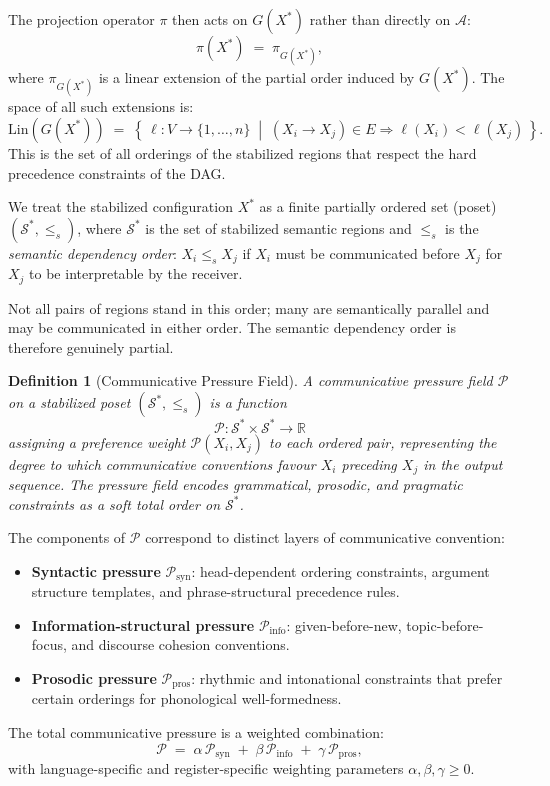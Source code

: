 \documentclass[11pt, a4paper]{article}
\theoremstyle{srn}
\newtheorem{definition}{Definition}[section]
\theoremstyle{srnremark}
\newcommand{\Aspace}{\mathcal{A}}           %
\begin{document}
The projection operator $\pi$ then acts on $G(X^*)$ rather than
directly on $\Aspace$:
\[
  \pi(X^*) \;=\; \pi_{G(X^*)},
\]
where $\pi_{G(X^*)}$ is a linear extension of the partial order
induced by $G(X^*)$.
The space of all such extensions is:
\[
  \mathrm{Lin}(G(X^*))
  \;=\;
  \left\{\,\ell : V \to \{1,\ldots,n\} \;\middle|\;
    (X_i \to X_j) \in E \Rightarrow \ell(X_i) < \ell(X_j)\,\right\}.
\]
This is the set of all orderings of the stabilized regions that
respect the hard precedence constraints of the DAG.

We treat the stabilized configuration $X^*$ as a finite partially
ordered set (poset) $(\mathcal{S}^*, \leq_s)$, where $\mathcal{S}^*$
is the set of stabilized semantic regions and $\leq_s$ is the
\emph{semantic dependency order}: $X_i \leq_s X_j$ if $X_i$ must be
communicated before $X_j$ for $X_j$ to be interpretable by the
receiver.

Not all pairs of regions stand in this order; many are semantically
parallel and may be communicated in either order.
The semantic dependency order is therefore genuinely partial.

\begin{definition}[Communicative Pressure Field]
\label{def:pressure}
A \emph{communicative pressure field} $\mathcal{P}$ on a stabilized
poset $(\mathcal{S}^*, \leq_s)$ is a function
\[
  \mathcal{P} : \mathcal{S}^* \times \mathcal{S}^* \to \mathbb{R}
\]
assigning a preference weight $\mathcal{P}(X_i, X_j)$ to each ordered
pair, representing the degree to which communicative conventions favour
$X_i$ preceding $X_j$ in the output sequence.
The pressure field encodes grammatical, prosodic, and pragmatic
constraints as a soft total order on $\mathcal{S}^*$.
\end{definition}

The components of $\mathcal{P}$ correspond to distinct layers of
communicative convention:
\begin{itemize}
  \item \textbf{Syntactic pressure} $\mathcal{P}_{\mathrm{syn}}$:
    head-dependent ordering constraints, argument structure templates,
    and phrase-structural precedence rules.
  \item \textbf{Information-structural pressure}
    $\mathcal{P}_{\mathrm{info}}$: given-before-new, topic-before-focus,
    and discourse cohesion conventions.
  \item \textbf{Prosodic pressure} $\mathcal{P}_{\mathrm{pros}}$:
    rhythmic and intonational constraints that prefer certain orderings
    for phonological well-formedness.
\end{itemize}
The total communicative pressure is a weighted combination:
\[
  \mathcal{P} \;=\; \alpha\,\mathcal{P}_{\mathrm{syn}}
  \;+\; \beta\,\mathcal{P}_{\mathrm{info}}
  \;+\; \gamma\,\mathcal{P}_{\mathrm{pros}},
\]
with language-specific and register-specific weighting parameters
$\alpha, \beta, \gamma \geq 0$.
\end{document}
